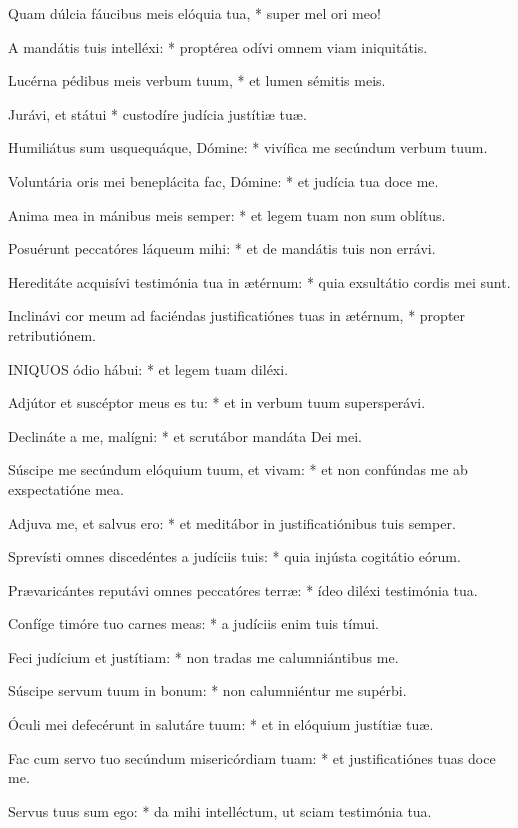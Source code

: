 Quam dúlcia fáucibus meis elóquia tua, * super mel ori meo!

A mandátis tuis intelléxi: * proptérea odívi omnem viam iniquitátis.

Lucérna pédibus meis verbum tuum, * et lumen sémitis meis.

Jurávi, et státui * custodíre judícia justítiæ tuæ.

Humiliátus sum usquequáque, Dómine: * vivífica me secúndum verbum tuum.

Voluntária oris mei beneplácita fac, Dómine: * et judícia tua doce me.

Anima mea in mánibus meis semper: * et legem tuam non sum oblítus.

Posuérunt peccatóres láqueum mihi: * et de mandátis tuis non errávi.

Hereditáte acquisívi testimónia tua in ætérnum: * quia exsultátio cordis mei sunt.

Inclinávi cor meum ad faciéndas justificatiónes tuas in ætérnum, * propter retributiónem.


\lettrine[lines=2]{I}{NIQUOS} ódio hábui: * et legem tuam diléxi.

Adjútor et suscéptor meus es tu: * et in verbum tuum supersperávi.

Declináte a me, malígni: * et scrutábor mandáta Dei mei.

Súscipe me secúndum elóquium tuum, et vivam: * et non confúndas me ab exspectatióne mea.

Adjuva me, et salvus ero: * et meditábor in justificatiónibus tuis semper.

Sprevísti omnes discedéntes a judíciis tuis: * quia injústa cogitátio eórum.

Prævaricántes reputávi omnes peccatóres terræ: * ídeo diléxi testimónia tua.

Confíge timóre tuo carnes meas: * a judíciis enim tuis tímui.

Feci judícium et justítiam: * non tradas me calumniántibus me.

Súscipe servum tuum in bonum: * non calumniéntur me supérbi.

Óculi mei defecérunt in salutáre tuum: * et in elóquium justítiæ tuæ.

Fac cum servo tuo secúndum misericórdiam tuam: * et justificatiónes tuas doce me.

Servus tuus sum ego: * da mihi intelléctum, ut sciam testimónia tua.

